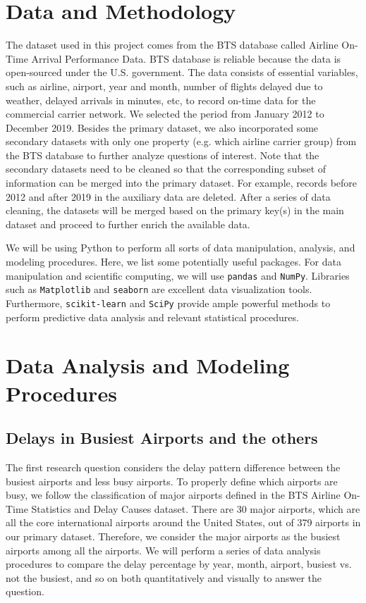 \documentclass[11pt, letterpaper]{article}
\begin{document}
\section{Data and Methodology}\label{sec:data_meth}
The dataset used in this project comes from the BTS database called Airline On-Time Arrival Performance Data. BTS database is reliable because the data is open-sourced under the U.S. government. The data consists of essential variables, such as airline, airport, year and month, number of flights delayed due to weather, delayed arrivals in minutes, etc, to record on-time data for the commercial carrier network. We selected the period from January 2012 to December 2019. Besides the primary dataset, we also incorporated some secondary datasets with only one property (e.g. which airline carrier group) from the BTS database to further analyze questions of interest. Note that the secondary datasets need to be cleaned so that the corresponding subset of information can be merged into the primary dataset. For example, records before 2012 and after 2019 in the auxiliary data are deleted. After a series of data cleaning, the datasets will be merged based on the primary key(s) in the main dataset and proceed to further enrich the available data.

We will be using Python to perform all sorts of data manipulation, analysis, and modeling procedures. Here, we list some potentially useful packages. For data manipulation and scientific computing, we will use \texttt{pandas} and \texttt{NumPy}. Libraries such as \texttt{Matplotlib} and \texttt{seaborn} are excellent data visualization tools. Furthermore, \texttt{scikit-learn} and \texttt{SciPy} provide ample powerful methods to perform predictive data analysis and relevant statistical procedures.

\section{Data Analysis and Modeling Procedures}\label{sec:da_mp}
\subsection{Delays in Busiest Airports and the others}
The first research question considers the delay pattern difference between the busiest airports and less busy airports. To properly define which airports are busy, we follow the classification of major airports defined in the BTS Airline On-Time Statistics and Delay Causes dataset. There are 30 major airports, which are all the core international airports around the United States, out of 379 airports in our primary dataset. Therefore, we consider the major airports as the busiest airports among all the airports. We will perform a series of data analysis procedures to compare the delay percentage by year, month, airport, busiest vs. not the busiest, and so on both quantitatively and visually to answer the question.
\end{document}
